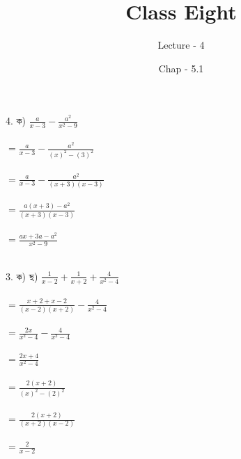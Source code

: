\documentclass{article}
\title{Class Eight}
\author{Lecture - 4}
\date{Chap - 5.1}
\begin{document}
    \maketitle      
\Large 

4. ক) \huge$\frac{a}{x - 3} - \frac{a^2}{x^2 - 9}$ \\ \\ 
\hspace*{1.5cm} $=\frac{a}{x - 3} - \frac{a^2}{(x)^2 - (3)^2}$ \\ \\ 
\hspace*{1.5cm} $=\frac{a}{x - 3} - \frac{a^2}{(x + 3)(x - 3)}$ \\ \\ 
\hspace*{1.5cm} $=\frac{a(x + 3)-a^2}{(x + 3)(x - 3)}$ \\  \\ 
\hspace*{1.5cm} $=\frac{ax + 3a - a^2}{x^2 - 9}$ \\ \\ 

\pagebreak

\Large
3. ক) ছ) \hspace{3mm} \huge $\frac{1}{x-2} + \frac{1}{x+2} + \frac{4}{x^2 - 4}$ \\ \\
\hspace*{2.5cm} $=\frac{x+2+x-2}{(x-2)(x+2)} - \frac{4}{x^2 - 4}$ \\ \\ 
\hspace*{2.5cm} $=\frac{2x}{x^2 - 4} - \frac{4}{x^2 - 4}$ \\ \\ 
\hspace*{2.5cm} $=\frac{2x+4}{x^2 - 4} $ \\ \\
\hspace*{2.5cm} $=\frac{2(x+2)}{(x)^2 - (2)^2} $ \\ \\ 
\hspace*{2.5cm} $=\frac{2(x+2)}{(x+2)(x-2)} $ \\ \\
\hspace*{2.5cm} $=\frac{2}{x-2} $ \\ \\
\end{document}
